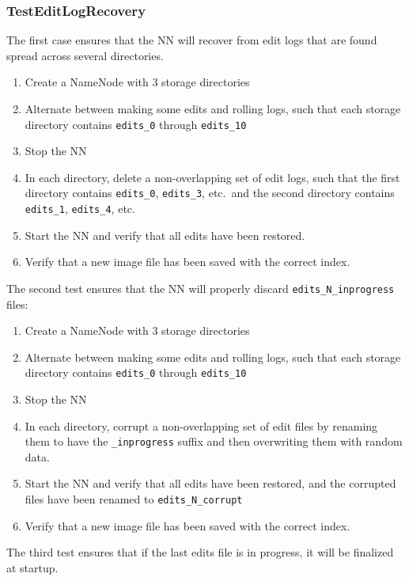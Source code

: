 \documentclass{article}
\begin{document}
\subsubsection{TestEditLogRecovery}

The first case ensures that the NN will recover from edit logs that are found spread across several directories.

\begin{enumerate}
\item Create a NameNode with 3 storage directories
\item Alternate between making some edits and rolling logs, such that each storage directory contains {\tt edits\_0} through {\tt edits\_10}
\item Stop the NN
\item In each directory, delete a non-overlapping set of edit logs, such that the first directory contains {\tt edits\_0}, {\tt edits\_3}, etc.\ and the second directory contains {\tt edits\_1}, {\tt edits\_4}, etc.
\item Start the NN and verify that all edits have been restored.
\item Verify that a new image file has been saved with the correct index.
\end{enumerate}

The second test ensures that the NN will properly discard {\tt edits\_N\_inprogress} files:

\begin{enumerate}
\item Create a NameNode with 3 storage directories
\item Alternate between making some edits and rolling logs, such that each storage directory contains {\tt edits\_0} through {\tt edits\_10}
\item Stop the NN
\item In each directory, corrupt a non-overlapping set of edit files by renaming them to have the {\tt \_inprogress} suffix and then overwriting them with random data.
\item Start the NN and verify that all edits have been restored, and the corrupted files have been renamed to {\tt edits\_N\_corrupt}
\item Verify that a new image file has been saved with the correct index.
\end{enumerate}

The third test ensures that if the last edits file is in progress, it will be finalized at startup.
\end{document}
